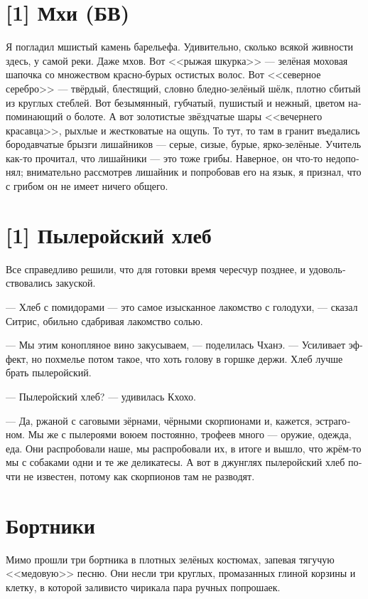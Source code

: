 \documentclass[a4paper,12pt,fleqn]{book}\usepackage{cooltooltips}\usepackage{polyglossia}\setdefaultlanguage[babelshorthands=true]{russian}\setotherlanguage{english}\defaultfontfeatures{Ligatures=TeX,Mapping=tex-text} \usepackage{xcolor}\definecolor{lightgray}{HTML}{bbbbbb}\color{lightgray}\newcommand{\ml}[3]{\textenglish{\textcolor{black}{#3}}}
\begin{document}
{\section{[1] Мхи (БВ)}

Я погладил мшистый камень барельефа.
Удивительно, сколько всякой живности здесь, у самой реки.
Даже мхов.
Вот <<рыжая шкурка>> --- зелёная моховая шапочка со множеством красно-бурых остистых волос.
Вот <<северное серебро>> --- твёрдый, блестящий, словно бледно-зелёный шёлк, плотно сбитый из круглых стеблей.
Вот безымянный, губчатый, пушистый и нежный, цветом напоминающий о болоте.
А вот золотистые звёздчатые шары <<вечернего красавца>>, рыхлые и жестковатые на ощупь.
То тут, то там в гранит въедались бородавчатые брызги лишайников --- серые, сизые, бурые, ярко-зелёные.
Учитель как-то прочитал, что лишайники --- это тоже грибы.
Наверное, он что-то недопонял;
внимательно рассмотрев лишайник и попробовав его на язык, я признал, что с грибом он не имеет ничего общего.

\section{[1] Пылеройский хлеб}

Все справедливо решили, что для готовки время чересчур позднее, и удовольствовались закуской.

--- Хлеб с помидорами --- это самое изысканное лакомство с голодухи, --- сказал Ситрис, обильно сдабривая лакомство солью.

--- Мы этим конопляное вино закусываем, --- поделилась Чханэ.
--- Усиливает эффект, но похмелье потом такое, что хоть голову в горшке держи.
Хлеб лучше брать пылеройский.

--- Пылеройский хлеб? --- удивилась Кхохо.

--- Да, ржаной с саговыми зёрнами, чёрными скорпионами и, кажется, эстрагоном.
Мы же с пылероями воюем постоянно, трофеев много --- оружие, одежда, еда.
Они распробовали наше, мы распробовали их, в итоге и вышло, что жрём-то мы с собаками одни и те же деликатесы.
А вот в джунглях пылеройский хлеб почти не известен, потому как скорпионов там не разводят.

\section{Бортники}

Мимо прошли три бортника в плотных зелёных костюмах, запевая тягучую <<медовую>> песню.
Они несли три круглых, промазанных глиной корзины и клетку, в которой заливисто чирикала пара ручных попрошаек.

}
\end{document}
